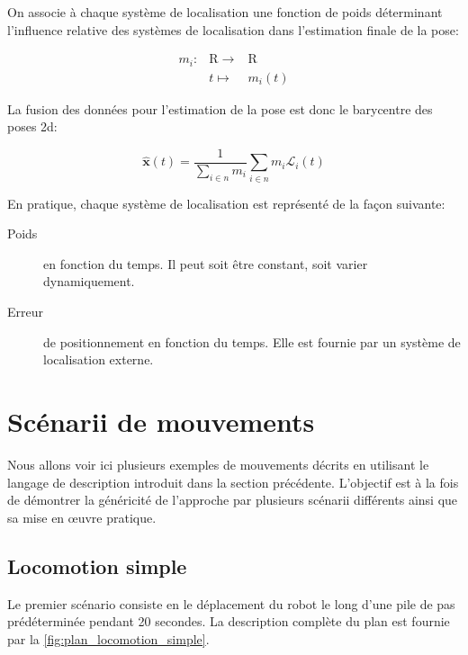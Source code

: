 On associe à chaque système de localisation une fonction de poids
déterminant l'influence relative des systèmes de localisation dans
l'estimation finale de la pose:

\begin{equation}
  \begin{array}{ccc}
    m_i : & \mathrm{R} \rightarrow & \mathrm{R}\\
      & t \mapsto & m_i(t)
  \end{array}
\end{equation}

La fusion des données pour l'estimation de la pose est donc le
barycentre des poses 2d:

\begin{equation}
  \mathbf{\hat{x}}(t) = \frac{1}{\sum_{i \in n} m_i} \sum_{i \in n} m_i \mathcal{L}_i(t)
\end{equation}

En pratique, chaque système de localisation est représenté de la façon suivante:
\begin{description}
\item[Poids] en fonction du temps. Il peut soit être constant, soit
  varier dynamiquement.
\item[Erreur] de positionnement en fonction du temps. Elle est fournie
  par un système de localisation externe.
\end{description}


\section{Scénarii de mouvements}


Nous allons voir ici plusieurs exemples de mouvements décrits en
utilisant le langage de description introduit dans la section
précédente. L'objectif est à la fois de démontrer la généricité de
l'approche par plusieurs scénarii différents ainsi que sa mise en
\oe uvre pratique.


\subsection{Locomotion simple}

Le premier scénario consiste en le déplacement du robot le long d'une
pile de pas prédéterminée pendant 20 secondes. La description
complète du plan est fournie par la \autoref{fig:plan_locomotion_simple}.

